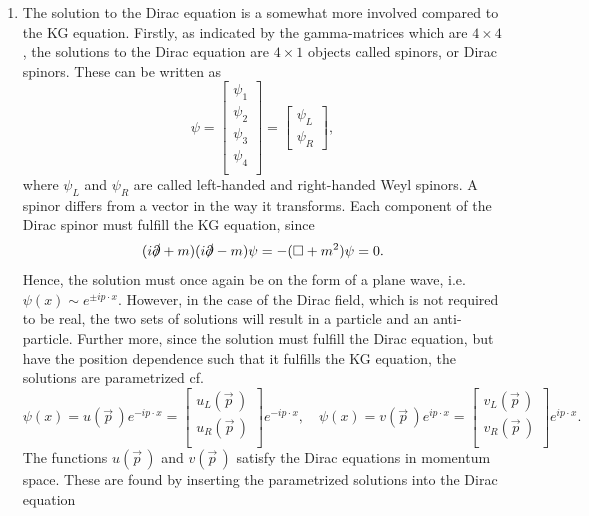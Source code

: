 \begin{enumerate}
	\item The solution to the Dirac equation is a somewhat more involved compared to the KG equation. Firstly, as indicated by the gamma-matrices which are $4\times 4$, the solutions to the Dirac equation are $4\times 1$ objects called spinors, or Dirac spinors. These can be written as
	\begin{equation}
		\psi=\begin{bmatrix}
			\psi_1\\
			\psi_2\\
			\psi_3\\
			\psi_4\\
		\end{bmatrix}=\begin{bmatrix}
		\psi_L\\
		\psi_R
	\end{bmatrix},
\end{equation} 
where $\psi_L$ and $\psi_R$ are called left-handed and right-handed Weyl spinors. A spinor differs from a vector in the way it transforms. Each component of the Dirac spinor must fulfill the KG equation, since
\begin{equation}
	(i\slashed \partial+m)(i\slashed \partial -m)\psi=-(\square+m^2)\psi=0.
\end{equation} 
Hence, the solution must once again be on the form of a plane wave, i.e. $\psi(x)\sim e^{\pm ip\cdot x}$. However, in the case of the Dirac field, which is not required to be real, the two sets of solutions will result in a particle and an anti-particle. Further more, since the solution must fulfill the Dirac equation, but have the position dependence such that it fulfills the KG equation, the solutions are parametrized cf.
\begin{equation}
	\psi(x)=u(\vec{p}\,)e^{-ip\cdot x}=\begin{bmatrix}
		u_L(\vec{p}\,) \\u_R(\vec{p}\,)\\
	\end{bmatrix}e^{-ip\cdot x}, \quad \psi(x)=v(\vec{p}\,)e^{ip\cdot x}=\begin{bmatrix}
	v_L(\vec{p}\,)\\
	v_R(\vec{p}\,)\\
\end{bmatrix}e^{ip\cdot x}.
\end{equation} 
The functions $u(\vec{p}\,)$ and $v(\vec{p}\,)$ satisfy the Dirac equations in momentum space. These are found by inserting the parametrized solutions into the Dirac equation

\end{enumerate}
